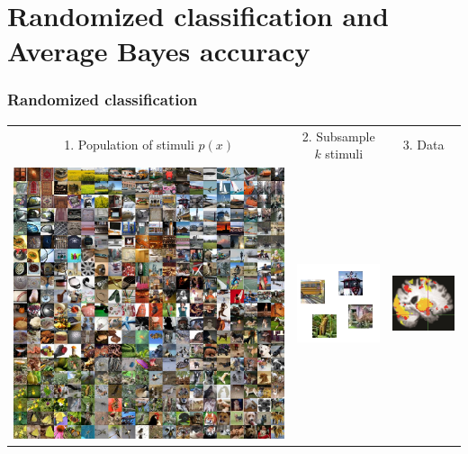 \documentclass{beamer}
\begin{document}
\section{Randomized classification and Average Bayes accuracy}

\begin{frame}
\sectionpage
\end{frame}

\begin{frame}
\frametitle{Randomized classification}
\begin{tabular}{c|c|c}
1. Population of stimuli $p(x)$ & 
2. Subsample $k$ stimuli &
3. Data\\
\includegraphics[scale = 0.05]{imagenet.jpg} &
\includegraphics[scale = 0.5]{imagenet_sub.png} &
\includegraphics[scale = 0.3]{smbrain2.png}
\end{tabular}


\end{frame}
\end{document}
